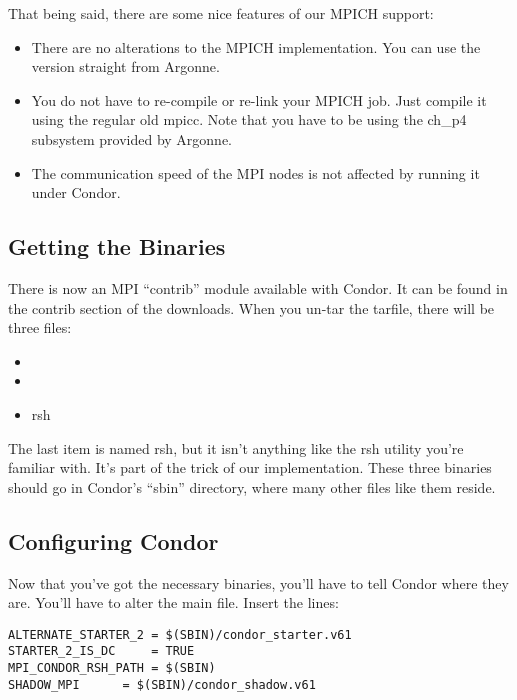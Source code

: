 That being said, there are some nice features of our MPICH support:
\begin{itemize}

\item There are no alterations to the MPICH implementation.  You can 
use the version straight from Argonne.

\item You do not have to re-compile or re-link your MPICH job.  Just
compile it using the regular old mpicc.  Note that you have to be using
the ch\_p4 subsystem provided by Argonne.

\item The communication speed of the MPI nodes is not affected by 
running it under Condor.

\end{itemize}

\subsection{\label{sec:MPI-binaries}Getting the Binaries}

There is now an MPI ``contrib'' module available with Condor.  It can
be found in the contrib section of the downloads.  When you un-tar the 
tarfile, there will be three files:

\begin{itemize}
\item{}
\item{}
\item{rsh}  
\end{itemize}

The last item is named rsh, but it isn't anything like the rsh utility
you're familiar with.  It's part of the trick of our implementation.
These three binaries should go in Condor's ``sbin'' directory, where
many other files like them reside.

\subsection{\label{sec:MPI-config}Configuring Condor }

Now that you've got the necessary binaries, you'll have to tell Condor
where they are.  You'll have to alter the main  file.
Insert the lines:
\begin{verbatim}
ALTERNATE_STARTER_2	= $(SBIN)/condor_starter.v61
STARTER_2_IS_DC		= TRUE
MPI_CONDOR_RSH_PATH	= $(SBIN)
SHADOW_MPI		= $(SBIN)/condor_shadow.v61
\end{verbatim}

